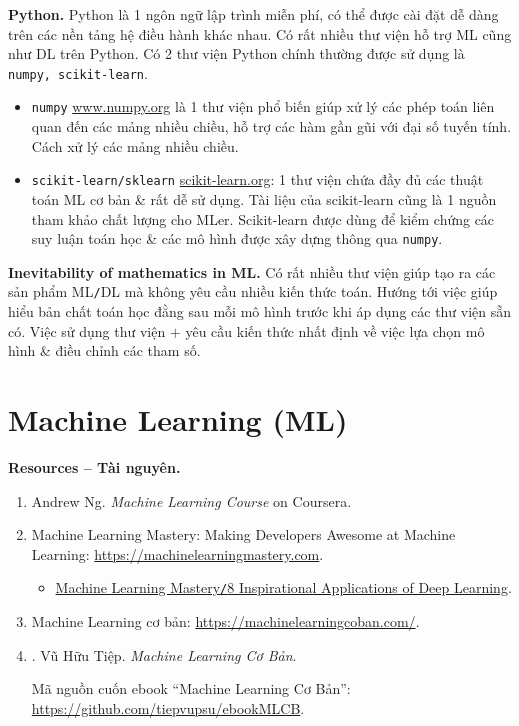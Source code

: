 \documentclass{article}
\begin{document}
{\bf Python.} Python là 1 ngôn ngữ lập trình miễn phí, có thể được cài đặt dễ dàng trên các nền tảng hệ điều hành khác nhau. Có rất nhiều thư viện hỗ trợ ML cũng như DL trên Python. Có 2 thư viện Python chính thường được sử dụng là {\tt numpy, scikit-learn}.
\begin{itemize}
	\item {\tt numpy} \url{www.numpy.org} là 1 thư viện phổ biến giúp xử lý các phép toán liên quan đến các mảng nhiều chiều, hỗ trợ các hàm gần gũi với đại số tuyến tính. Cách xử lý các mảng nhiều chiều.
	\item {\tt scikit-learn/sklearn} \url{scikit-learn.org}: 1 thư viện chứa đầy đủ các thuật toán ML cơ bản \& rất dễ sử dụng. Tài liệu của scikit-learn cũng là 1 nguồn tham khảo chất lượng cho MLer. Scikit-learn được dùng để kiểm chứng các suy luận toán học \& các mô hình được xây dựng thông qua {\tt numpy}.
\end{itemize}
{\bf Inevitability of mathematics in ML.} Có rất nhiều thư viện giúp tạo ra các sản phẩm ML{\tt/}DL mà không yêu cầu nhiều kiến thức toán. Hướng tới việc giúp hiểu bản chất toán học đằng sau mỗi mô hình trước khi áp dụng các thư viện sẵn có. Việc sử dụng thư viện $+$ yêu cầu kiến thức nhất định về việc lựa chọn mô hình \& điều chỉnh các tham số.


\section{Machine Learning (ML)}
\textbf{\textsf{Resources -- Tài nguyên.}}
\begin{enumerate}
	\item {\sc Andrew Ng}. {\it Machine Learning Course} on Coursera.
	\item Machine Learning Mastery: Making Developers Awesome at Machine Learning: \url{https://machinelearningmastery.com}.
	\begin{itemize}
		\item \href{https://machinelearningmastery.com/inspirational-applications-deep-learning/}{Machine Learning Mastery{\tt/}8 Inspirational Applications of Deep Learning}.
	\end{itemize}
	\item Machine Learning cơ bản:
	 \url{https://machinelearningcoban.com/}.
	\item \cite{Tiep_ML_co_ban}. {\sc Vũ Hữu Tiệp}. {\it Machine Learning Cơ Bản}.
	
	Mã nguồn cuốn ebook ``Machine Learning Cơ Bản'': \url{https://github.com/tiepvupsu/ebookMLCB}.
\end{enumerate}
\end{document}
